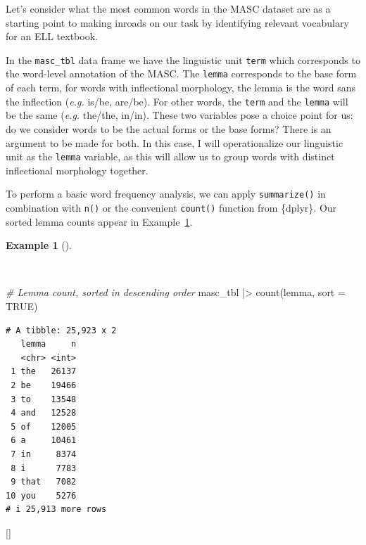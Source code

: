 \documentclass[
  letterpaper,
  krantz1]{latex/krantz-mod}
\newenvironment{Shaded}{\begin{snugshade}}{\end{snugshade}}
\newcommand{\AttributeTok}[1]{\textcolor[rgb]{0.00,0.00,0.00}{#1}}
\newcommand{\CommentTok}[1]{\textcolor[rgb]{0.00,0.00,0.00}{\textit{#1}}}
\newcommand{\ConstantTok}[1]{\textcolor[rgb]{0.00,0.00,0.00}{#1}}
\newcommand{\FunctionTok}[1]{\textcolor[rgb]{0.00,0.00,0.00}{#1}}
\newcommand{\NormalTok}[1]{\textcolor[rgb]{0.00,0.00,0.00}{#1}}
\newcommand{\SpecialCharTok}[1]{\textcolor[rgb]{0.00,0.00,0.00}{#1}}
\newcommand{\cindex}[1]{%
  \StrSubstitute{#1}{_}{\_}[\temp]%
  \index{\temp}%
}
\theoremstyle{definition}
\theoremstyle{definition}
\newtheorem{example}{Example}[chapter]
\theoremstyle{remark}
\begin{document}
\vspace{-1em}

Let's consider what the most common words in the MASC dataset are as a
starting point to making inroads on our task by identifying relevant
vocabulary for an ELL textbook.

In the \texttt{masc\_tbl} data frame we have the linguistic unit
\texttt{term} which corresponds to the word-level
annotation of the MASC. The \texttt{lemma} corresponds to the base form
of each term, for words with inflectional
morphology, the lemma is the word sans the
inflection (\emph{e.g.} is/be, are/be). For other words, the
\texttt{term} and the \texttt{lemma} will be the same (\emph{e.g.}
the/the, in/in). These two variables pose a choice point for us: do we
consider words to be the actual forms or the base forms? There is an
argument to be made for both. In this case, I will
operationalize our linguistic unit as the
\texttt{lemma} variable, as this will allow us to group words with
distinct inflectional morphology together.

To perform a basic word frequency analysis, we can apply
\texttt{summarize()} in combination with \texttt{n()} or the convenient
\texttt{count()} function from \{dplyr\}. Our sorted lemma counts appear
in Example~\ref{exm-explore-masc-count}.

\begin{example}[]\protect\hypertarget{exm-explore-masc-count}{}\label{exm-explore-masc-count}

~

\begin{Shaded}
\begin{Highlighting}[numbers=left,,]
\CommentTok{\# Lemma count, sorted in descending order}
\NormalTok{masc\_tbl }\SpecialCharTok{|\textgreater{}}
  \FunctionTok{count}\NormalTok{(lemma, }\AttributeTok{sort =} \ConstantTok{TRUE}\NormalTok{)}
\end{Highlighting}
\end{Shaded}

\begin{verbatim}
# A tibble: 25,923 x 2
   lemma     n
   <chr> <int>
 1 the   26137
 2 be    19466
 3 to    13548
 4 and   12528
 5 of    12005
 6 a     10461
 7 in     8374
 8 i      7783
 9 that   7082
10 you    5276
# i 25,913 more rows
\end{verbatim}

 \cindex{count()}

\end{example}
\end{document}
